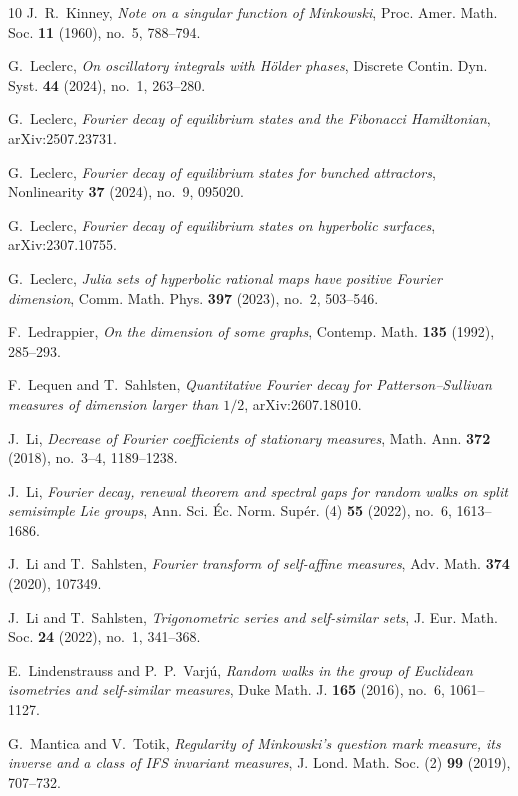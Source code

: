 \documentclass[11pt]{amsart}
\theoremstyle{plain}
\theoremstyle{definition}
\numberwithin{equation}{section}
\begin{document}
\begin{thebibliography}{10}
J.~R.~Kinney,
\emph{Note on a singular function of Minkowski},
Proc. Amer. Math. Soc. \textbf{11} (1960), no.~5, 788--794.

G.~Leclerc,
\emph{On oscillatory integrals with H\"older phases},
Discrete Contin. Dyn. Syst. \textbf{44} (2024), no.~1, 263--280.

G.~Leclerc,
\emph{Fourier decay of equilibrium states and the Fibonacci Hamiltonian},
arXiv:2507.23731.

G.~Leclerc,
\emph{Fourier decay of equilibrium states for bunched attractors},
Nonlinearity \textbf{37} (2024), no.~9, 095020.

G.~Leclerc,
\emph{Fourier decay of equilibrium states on hyperbolic surfaces},
arXiv:2307.10755.

G.~Leclerc,
\emph{Julia sets of hyperbolic rational maps have positive Fourier dimension},
Comm. Math. Phys. \textbf{397} (2023), no.~2, 503--546.

F.~Ledrappier,
\emph{On the dimension of some graphs},
Contemp. Math. \textbf{135} (1992), 285--293.

F.~Lequen and T.~Sahlsten,
\emph{Quantitative Fourier decay for Patterson--Sullivan measures of dimension larger than $1/2$},
arXiv:2607.18010.

J.~Li,
\emph{Decrease of Fourier coefficients of stationary measures},
Math. Ann. \textbf{372} (2018), no.~3--4, 1189--1238.

J.~Li,
\emph{Fourier decay, renewal theorem and spectral gaps for random walks on split semisimple Lie groups},
Ann. Sci. \'Ec. Norm. Sup\'er. (4) \textbf{55} (2022), no.~6, 1613--1686.

J.~Li and T.~Sahlsten,
\emph{Fourier transform of self-affine measures},
Adv. Math. \textbf{374} (2020), 107349.

J.~Li and T.~Sahlsten,
\emph{Trigonometric series and self-similar sets},
J. Eur. Math. Soc. \textbf{24} (2022), no.~1, 341--368.

E.~Lindenstrauss and P.~P.~Varj\'u,
\emph{Random walks in the group of Euclidean isometries and self-similar measures},
Duke Math. J. \textbf{165} (2016), no.~6, 1061--1127.

G.~Mantica and V.~Totik,
\emph{Regularity of Minkowski's question mark measure, its inverse and a class of IFS invariant measures},
J. Lond. Math. Soc. (2) \textbf{99} (2019), 707--732.


\end{thebibliography}
\end{document}
